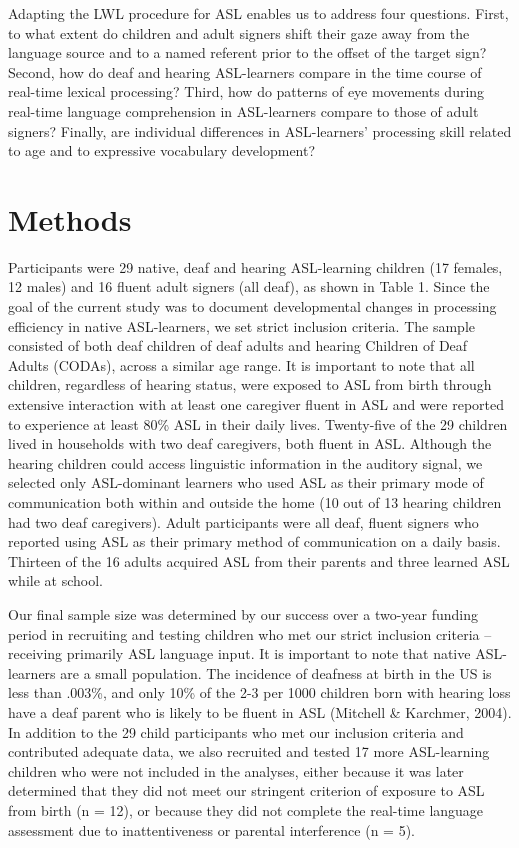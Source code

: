 \documentclass[oneside]{report}
\begin{document}
Adapting the LWL procedure for ASL enables us to address four questions.
First, to what extent do children and adult signers shift their gaze
away from the language source and to a named referent prior to the
offset of the target sign? Second, how do deaf and hearing ASL-learners
compare in the time course of real-time lexical processing? Third, how
do patterns of eye movements during real-time language comprehension in
ASL-learners compare to those of adult signers? Finally, are individual
differences in ASL-learners' processing skill related to age and to
expressive vocabulary development?

\hypertarget{methods}{%
\section{Methods}\label{methods}}

Participants were 29 native, deaf and hearing ASL-learning children (17
females, 12 males) and 16 fluent adult signers (all deaf), as shown in
Table 1. Since the goal of the current study was to document
developmental changes in processing efficiency in native ASL-learners,
we set strict inclusion criteria. The sample consisted of both deaf
children of deaf adults and hearing Children of Deaf Adults (CODAs),
across a similar age range. It is important to note that all children,
regardless of hearing status, were exposed to ASL from birth through
extensive interaction with at least one caregiver fluent in ASL and were
reported to experience at least 80\% ASL in their daily lives.
Twenty-five of the 29 children lived in households with two deaf
caregivers, both fluent in ASL. Although the hearing children could
access linguistic information in the auditory signal, we selected only
ASL-dominant learners who used ASL as their primary mode of
communication both within and outside the home (10 out of 13 hearing
children had two deaf caregivers). Adult participants were all deaf,
fluent signers who reported using ASL as their primary method of
communication on a daily basis. Thirteen of the 16 adults acquired ASL
from their parents and three learned ASL while at school.

Our final sample size was determined by our success over a two-year
funding period in recruiting and testing children who met our strict
inclusion criteria -- receiving primarily ASL language input. It is
important to note that native ASL-learners are a small population. The
incidence of deafness at birth in the US is less than .003\%, and only
10\% of the 2-3 per 1000 children born with hearing loss have a deaf
parent who is likely to be fluent in ASL (Mitchell \& Karchmer, 2004).
In addition to the 29 child participants who met our inclusion criteria
and contributed adequate data, we also recruited and tested 17 more
ASL-learning children who were not included in the analyses, either
because it was later determined that they did not meet our stringent
criterion of exposure to ASL from birth (n = 12), or because they did
not complete the real-time language assessment due to inattentiveness or
parental interference (n = 5).
\end{document}
